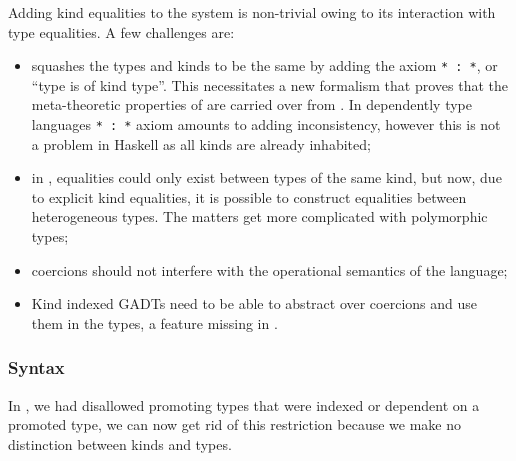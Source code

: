 \documentclass[screen,nonacm]{acmart}
\begin{document}
Adding kind equalities to the system is non-trivial owing to its interaction with type equalities. A few challenges are:
\begin{itemize}
 \item \SFK squashes the types and kinds to be the same by adding the axiom \lstinline{* : *}, or ``type is of kind type''. This necessitates a new formalism that proves that the meta-theoretic properties of \SFK are carried over from \SFC. In dependently type languages \lstinline{* : *} axiom amounts to adding inconsistency, however this is not a problem in Haskell as all kinds are already inhabited;
 \item in \SFC, equalities could only exist between types of the same kind, but now, due to explicit kind equalities, it is possible to construct equalities between heterogeneous types. The matters get more complicated with polymorphic types;
 \item coercions should not interfere with the operational semantics of the language;
 \item Kind indexed GADTs need to be able to abstract over coercions and use them in the types, a feature missing in \SFC.
\end{itemize}

\subsubsection{Syntax}\label{sec:sfk-syntax}
In \SFP, we had disallowed promoting types that were indexed or dependent on a promoted type, we can now get rid of this restriction because we make no distinction between kinds and types.
\end{document}

